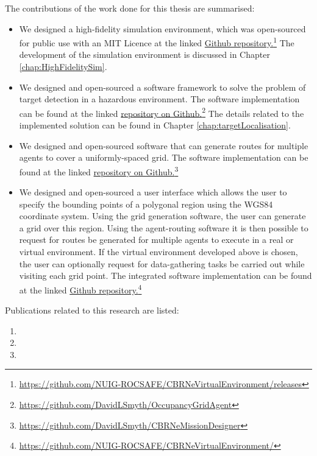 The contributions of the work done for this thesis are summarised:
\begin{itemize}
    \item We designed a high-fidelity simulation environment, which was open-sourced for public use with an MIT Licence at the linked \href{https://github.com/NUIG-ROCSAFE/CBRNeVirtualEnvironment/releases}{Github repository.}\footnote{\href {https://github.com/NUIG-ROCSAFE/CBRNeVirtualEnvironment/releases}{https://github.com/NUIG-ROCSAFE/CBRNeVirtualEnvironment/releases}} The development of the simulation environment is discussed in Chapter \ref{chap:HighFidelitySim}.
    \item We designed and open-sourced a software framework to solve the problem of target detection in a hazardous environment. The software implementation can be found at the linked 
    \href{https://github.com/DavidLSmyth/OccupancyGridAgent}{repository on Github.}\footnote{\href {https://github.com/DavidLSmyth/OccupancyGridAgent}{https://github.com/DavidLSmyth/OccupancyGridAgent}} The details related to the implemented solution can be found in Chapter \ref{chap:targetLocalisation}.
    \item We designed and open-sourced software that can generate routes for multiple agents to cover a uniformly-spaced grid. The software implementation can be found at the linked 
    \href{https://github.com/DavidLSmyth/CBRNeMissionDesigner}{repository on Github.}\footnote{\href {https://github.com/DavidLSmyth/CBRNeMissionDesigner}{https://github.com/DavidLSmyth/CBRNeMissionDesigner}}
    \item We designed and open-sourced a user interface which allows the user to specify the bounding points of a polygonal region using the WGS84 coordinate system. Using the grid generation  software, the user can generate a grid over this region. Using the agent-routing software it is then possible to request for routes be generated for multiple agents to execute in a real or virtual environment. If the virtual environment developed above is chosen, the user can optionally request for data-gathering tasks be carried out while visiting each grid point. The integrated software implementation can be found at the linked \href{https://github.com/NUIG-ROCSAFE/CBRNeVirtualEnvironment/}{Github repository.}\footnote{\href {https://github.com/NUIG-ROCSAFE/CBRNeVirtualEnvironment/}{https://github.com/NUIG-ROCSAFE/CBRNeVirtualEnvironment/}}
\end{itemize}

Publications related to this research are listed:
\begin{enumerate}
    \item {}
    \item {}
    \item {}

\end{enumerate}